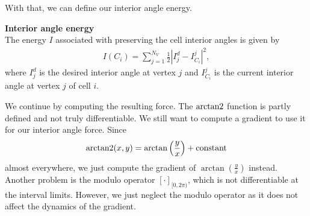 With that, we can define our interior angle energy. 
\begin{definition} \textbf{Interior angle energy} \\
	The energy $I$ associated with preserving the cell interior angles is given by
	\begin{align}
		I(C_i) = \sum\limits_{j=1}^{N_V} \frac{1}{2}| I_{j}^d - I^j_{C_i} |^2, 
	\end{align}
	where $I_{j}^d$ is the desired interior angle at vertex $j$ and $I^j_{C_i}$ is the current interior angle at vertex $j$ of cell $i$. 
\end{definition}


We continue by computing the resulting force. 
The $\operatorname{arctan2}$ function is partly defined and not truly differentiable. 
We still want to compute a gradient to use it for our interior angle force. 
Since $$\operatorname{arctan2}(x,y) = \arctan\left(\frac{y}{x} \right) + \text{constant}$$ almost everywhere, we just compute the gradient of $\arctan(\frac{y}{x})$ instead. \\
Another problem is the modulo operator $[ \cdot ]_{[0,2\pi)}$, which is not differentiable at the interval limits.
However, we just neglect the modulo operator as it does not affect the dynamics of the gradient.

